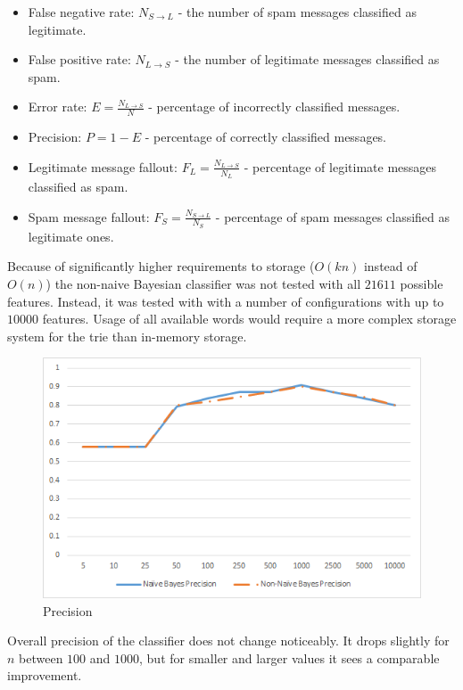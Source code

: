 \documentclass[12pt]{report}
\begin{document}
\begin{itemize}
	\item False negative rate: $N_{S \rightarrow L}$ - the number of spam messages classified as legitimate.
	\item False positive rate: $N_{L \rightarrow S}$ - the number of legitimate messages classified as spam.
	\item Error rate: $E = \frac{N_{L \rightarrow S}}{N}$ - percentage of incorrectly classified messages.
	\item Precision: $P = 1 - E$ - percentage of correctly classified messages.
	\item Legitimate message fallout: $F_L = \frac{N_{L \rightarrow S}}{N_L}$ - percentage  of legitimate messages classified as spam.
	\item Spam message fallout: $F_S = \frac{N_{S \rightarrow L}}{N_S}$ - percentage of spam messages classified as legitimate ones.
\end{itemize}

Because of significantly higher requirements to storage ($O(kn)$ instead of $O(n)$) the non-naive Bayesian classifier was not tested with all $21611$ possible features. Instead, it was tested with with a number of configurations with up to $10000$ features. Usage of all available words would require a more complex storage system for the trie than in-memory storage.

\begin{figure}[ht!]
	\centering
	\includegraphics[width=120mm]{Precision.png}
	\caption{Precision}
	\label{PrecisionGraph}
\end{figure}

Overall precision of the classifier does not change noticeably. It drops slightly for $n$ between $100$ and $1000$, but for smaller and larger values it sees a comparable improvement.
\end{document}
